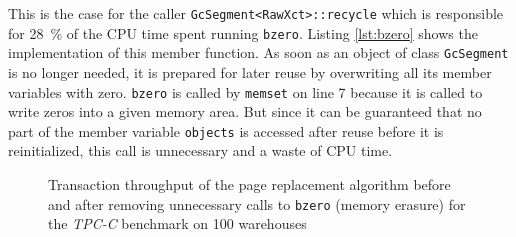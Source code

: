     This is the case for the caller \lstinline|GcSegment<RawXct>::recycle| which is responsible for \SI{28}{\percent} of the CPU time spent running \lstinline|bzero|. Listing \ref{lst:bzero} shows the implementation of this member function. As soon as an object of class \lstinline|GcSegment| is no longer needed, it is prepared for later reuse by overwriting all its member variables with zero. \lstinline|bzero| is called by \lstinline|memset| on line 7 because it is called to write zeros into a given memory area. But since it can be guaranteed that no part of the member variable \lstinline|objects| is accessed after reuse before it is reinitialized, this call is unnecessary and a waste of CPU time.

\begin{@empty}

    \begin{figure}[ht!]
        \centering
        \caption[Transaction throughput without unnecessary bzero calls]{Transaction throughput of the  page replacement algorithm before and after removing unnecessary calls to \lstinline|bzero| (memory erasure) for the \textit{TPC-C} benchmark on 100 warehouses}
        \label{fig:bzerothroughput}
    \end{figure}
\end{@empty}

